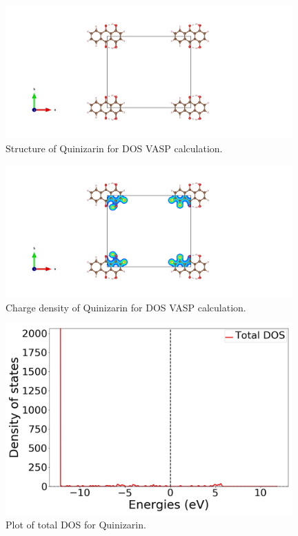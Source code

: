 \documentclass{article}
\begin{document}
  \begin{figure}[H]
      \centering
      \includegraphics[width = 11cm]{../fig/basic_DOS_CONTCAR.png}
      \caption{Structure of Quinizarin for DOS VASP calculation. }
      \label{fig:basic_DOS_CONTCAR}
  \end{figure}

  \begin{figure}[H]
      \centering
      \includegraphics[width = 11cm]{../fig/basic_DOS_CHGCAR.png}
      \caption{Charge density of Quinizarin for DOS VASP calculation. }
      \label{fig:basic_DOS_CHGCAR}
  \end{figure}

  \begin{figure}[H]
      \centering
      \includegraphics[width = 11cm]{../fig/basic_TDOS_1.png}
      \caption{Plot of total DOS for Quinizarin. }
      \label{fig:basic_TDOS_1}
  \end{figure}
\end{document}
